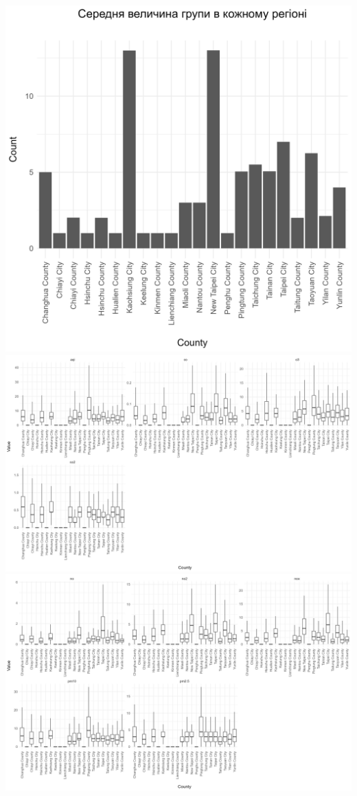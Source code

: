 \documentclass{article}
\begin{document}
\begin{enumerate}
    \begin{center}
    \includegraphics[width=6in]{question7/bar-count.png}
    \includegraphics[width=6in]{question7/box-county-p1.png}
    \includegraphics[width=6in]{question7/box-county-p2.png}

\end{center}
\end{enumerate}
\end{document}
